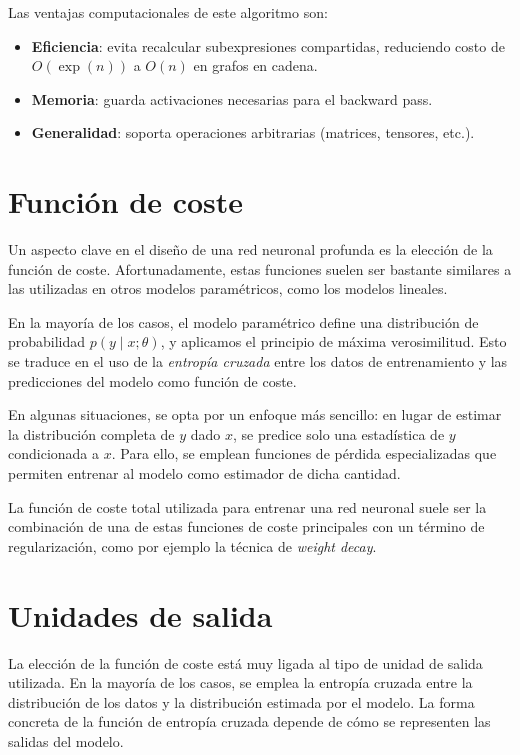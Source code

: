 Las ventajas computacionales de este algoritmo son: 
\begin{itemize}
    \item \textbf{Eficiencia}: evita recalcular subexpresiones compartidas, reduciendo costo de $O(\exp(n))$ a $O(n)$ en grafos en cadena.
    \item  \textbf{Memoria}: guarda activaciones necesarias para el backward pass.
    \item \textbf{Generalidad}: soporta operaciones arbitrarias (matrices, tensores, etc.).
\end{itemize}

\section{Función de coste}
Un aspecto clave en el diseño de una red neuronal profunda es la elección de la función de coste. Afortunadamente, estas funciones suelen ser bastante similares a las utilizadas en otros modelos paramétricos, como los modelos lineales.

En la mayoría de los casos, el modelo paramétrico define una distribución de probabilidad $p(y \mid x; \theta)$, y aplicamos el principio de máxima verosimilitud. Esto se traduce en el uso de la \textit{entropía cruzada} entre los datos de entrenamiento y las predicciones del modelo como función de coste.

En algunas situaciones, se opta por un enfoque más sencillo: en lugar de estimar la distribución completa de $y$ dado $x$, se predice solo una estadística de $y$ condicionada a $x$. Para ello, se emplean funciones de pérdida especializadas que permiten entrenar al modelo como estimador de dicha cantidad.

La función de coste total utilizada para entrenar una red neuronal suele ser la combinación de una de estas funciones de coste principales con un término de regularización, como por ejemplo la técnica de \textit{weight decay}.

\section{Unidades de salida}
La elección de la función de coste está muy ligada al tipo de unidad de salida utilizada. En la mayoría de los casos, se emplea la entropía cruzada entre la distribución de los datos y la distribución estimada por el modelo. La forma concreta de la función de entropía cruzada depende de cómo se representen las salidas del modelo.


